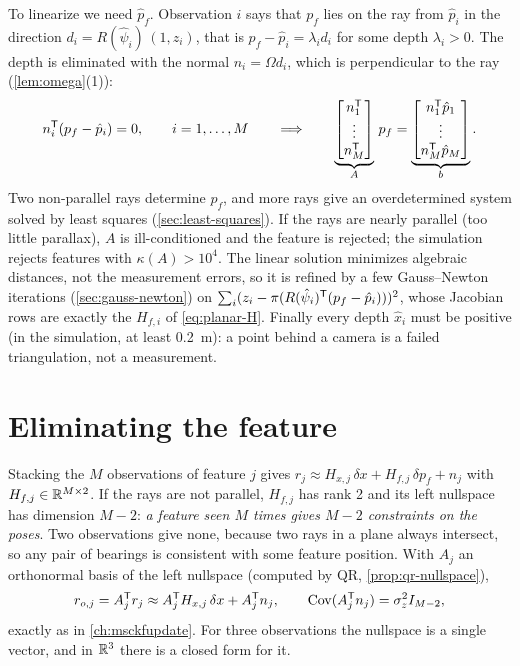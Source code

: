To linearize we need $\hat p_f$. Observation $i$ says that $p_f$ lies on the ray from $\hat p_i$ in the direction $d_i = R(\hat\psi_i)\,(1, z_i)$,
that is $p_f - \hat p_i = \lambda_i d_i$ for some depth $\lambda_i > 0$. The depth is eliminated with the normal $n_i = \Omega d_i$, which is perpendicular to the ray
(\cref{lem:omega}(1)):
\begin{equation}
  n_i^{\mathsf{T}}(p_f - \hat p_i) = 0, \qquad i = 1, \dots, M \qquad\Longrightarrow\qquad
  \underbrace{\begin{bmatrix} n_1^{\mathsf{T}} \\ \vdots \\ n_M^{\mathsf{T}}\end{bmatrix}}_{A}\,p_f = \underbrace{\begin{bmatrix} n_1^{\mathsf{T}}\hat p_1 \\ \vdots \\ n_M^{\mathsf{T}}\hat p_M\end{bmatrix}}_{b}.
  \label{eq:planar-tri}
\end{equation}
Two non-parallel rays determine $p_f$, and more rays give an overdetermined system solved by least squares (\cref{sec:least-squares}).
If the rays are nearly parallel (too little parallax), $A$ is ill-conditioned and the feature is rejected; the simulation rejects
features with $\kappa(A) > 10^4$. The linear solution minimizes algebraic distances, not the measurement errors, so it is refined by a few
Gauss--Newton iterations (\cref{sec:gauss-newton}) on $\sum_i (z_i - \pi(R(\hat\psi_i)^{\mathsf{T}}(p_f - \hat p_i)))^2$, whose Jacobian rows are exactly the
$H_{f,i}$ of \eqref{eq:planar-H}. Finally every depth $\hat x_i$ must be positive (in the simulation, at least \SI{0.2}{m}): a point behind a
camera is a failed triangulation, not a measurement.

\section{Eliminating the feature}

Stacking the $M$ observations of feature $j$ gives $r_j \approx H_{x,j}\,\delta x + H_{f,j}\,\delta p_f + n_j$ with $H_{f,j} \in \mathbb{R}^{M\times2}$. If the
rays are not parallel, $H_{f,j}$ has rank 2 and its left nullspace has dimension $M - 2$: \emph{a feature seen $M$ times gives $M - 2$ constraints on
the poses}. Two observations give none, because two rays in a plane always intersect, so any pair of bearings is consistent with some
feature position. With $A_j$ an orthonormal basis of the left nullspace (computed by QR, \cref{prop:qr-nullspace}),
\begin{equation}
  r_{o,j} = A_j^{\mathsf{T}} r_j \approx A_j^{\mathsf{T}} H_{x,j}\,\delta x + A_j^{\mathsf{T}} n_j, \qquad \operatorname{Cov}(A_j^{\mathsf{T}} n_j) = \sigma_z^2 I_{M-2},
\end{equation}
exactly as in \cref{ch:msckfupdate}. For three observations the nullspace is a single vector, and in $\mathbb{R}^3$ there is a closed form for it.

